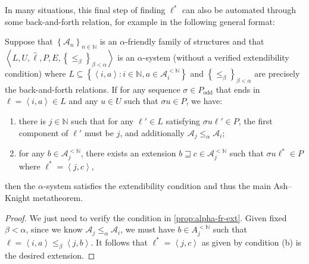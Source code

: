 \documentclass[11pt]{article}
\theoremstyle{plain}
\theoremstyle{definition}
\newcommand{\tuple}[1]{\left\langle #1 \right\rangle}
\begin{document}
In many situations, this final step of finding $\ell^*$ can also be automated through some back-and-forth relation, for example in the following general format:

\begin{corollary}
  \label{cor:auto-ext-metathm}
  Suppose that $\left\{\mathcal{A}_n\right\}_{n \in \mathbb{N}}$ is an $\alpha$-friendly family of structures and that $\tuple{L, U, \hat{\ell}, P, E, \left\{\leq_\beta\right\}_{\beta < \alpha}}$ is an $\alpha$-system (without a verified extendibility condition) where $L \subseteq \left\{\tuple{i, a} : i \in \mathbb{N}, a \in \mathcal{A}_i^{<\mathbb{N}}\right\}$ and $\left\{\leq_\beta\right\}_{\beta < \alpha}$ are precisely the back-and-forth relations. If for any sequence $\sigma \in P_\text{odd}$ that ends in $\ell = \tuple{i, a} \in L$ and any $u \in U$ such that $\sigma u \in P$, we have:
  \begin{enumerate}[label=\textnormal{(\alph*)}]
    \item there is $j \in \mathbb{N}$ such that for any $\ell' \in L$ satisfying $\sigma u \ell' \in P$, the first component of $\ell'$ must be $j$, and additionally $\mathcal{A}_j \leq_\alpha \mathcal{A}_i$;
    \item for any $b \in \mathcal{A}_j^{<\mathbb{N}}$, there exists an extension $b \sqsupseteq c \in \mathcal{A}_j^{<\mathbb{N}}$ such that $\sigma u \ell^* \in P$ where $\ell^* = \tuple{j, c}$,
  \end{enumerate}
  then the $\alpha$-system satisfies the extendibility condition and thus the main Ash--Knight metatheorem.
\end{corollary}

\begin{proof}
  We just need to verify the condition in \autoref{prop:alpha-fr-ext}. Given fixed $\beta < \alpha$, since we know $\mathcal{A}_j \leq_\alpha \mathcal{A}_i$, we must have $b \in A_j^{<\mathbb{N}}$ such that $\ell = \tuple{i, a} \leq_\beta \tuple{j, b}$. It follows that $\ell^* = \tuple{j, c}$ as given by condition (b) is the desired extension.
\end{proof}
\end{document}
